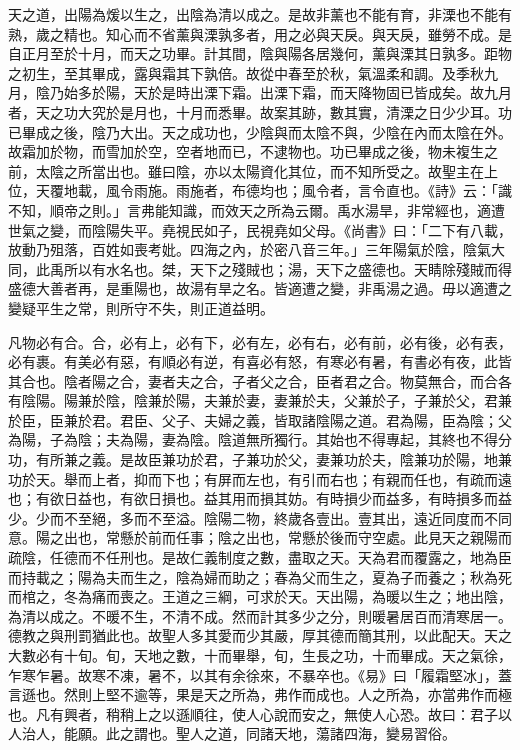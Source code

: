 
天之道，出陽為煖以生之，出陰為清以成之。是故非薰也不能有育，非溧也不能有熟，歲之精也。知心而不省薰與溧孰多者，用之必與天戾。與天戾，雖勞不成。是自正月至於十月，而天之功畢。計其間，陰與陽各居幾何，薰與溧其日孰多。距物之初生，至其畢成，露與霜其下孰倍。故從中春至於秋，氣溫柔和調。及季秋九月，陰乃始多於陽，天於是時出溧下霜。出溧下霜，而天降物固已皆成矣。故九月者，天之功大究於是月也，十月而悉畢。故案其跡，數其實，清溧之日少少耳。功已畢成之後，陰乃大出。天之成功也，少陰與而太陰不與，少陰在內而太陰在外。故霜加於物，而雪加於空，空者地而已，不逮物也。功已畢成之後，物未複生之前，太陰之所當出也。雖曰陰，亦以太陽資化其位，而不知所受之。故聖主在上位，天覆地載，風令雨施。雨施者，布德均也；風令者，言令直也。《詩》云：「識不知，順帝之則。」言弗能知識，而效天之所為云爾。禹水湯旱，非常經也，適遭世氣之變，而陰陽失平。堯視民如子，民視堯如父母。《尚書》曰：「二下有八載，放動乃殂落，百姓如喪考妣。四海之內，於密八音三年。」三年陽氣於陰，陰氣大同，此禹所以有水名也。桀，天下之殘賊也；湯，天下之盛德也。天睛除殘賊而得盛德大善者再，是重陽也，故湯有旱之名。皆適遭之變，非禹湯之過。毋以適遭之變疑平生之常，則所守不失，則正道益明。


凡物必有合。合，必有上，必有下，必有左，必有右，必有前，必有後，必有表，必有裹。有美必有惡，有順必有逆，有喜必有怒，有寒必有暑，有書必有夜，此皆其合也。陰者陽之合，妻者夫之合，子者父之合，臣者君之合。物莫無合，而合各有陰陽。陽兼於陰，陰兼於陽，夫兼於妻，妻兼於夫，父兼於子，子兼於父，君兼於臣，臣兼於君。君臣、父子、夫婦之義，皆取諸陰陽之道。君為陽，臣為陰；父為陽，子為陰；夫為陽，妻為陰。陰道無所獨行。其始也不得專起，其終也不得分功，有所兼之義。是故臣兼功於君，子兼功於父，妻兼功於夫，陰兼功於陽，地兼功於天。舉而上者，抑而下也；有屏而左也，有引而右也；有親而任也，有疏而遠也；有欲日益也，有欲日損也。益其用而損其妨。有時損少而益多，有時損多而益少。少而不至絕，多而不至溢。陰陽二物，終歲各壹出。壹其出，遠近同度而不同意。陽之出也，常懸於前而任事；陰之出也，常懸於後而守空處。此見天之親陽而疏陰，任德而不任刑也。是故仁義制度之數，盡取之天。天為君而覆露之，地為臣而持載之；陽為夫而生之，陰為婦而助之；春為父而生之，夏為子而養之；秋為死而棺之，冬為痛而喪之。王道之三綱，可求於天。天出陽，為暖以生之；地出陰，為清以成之。不暖不生，不清不成。然而計其多少之分，則暖暑居百而清寒居一。德教之與刑罰猶此也。故聖人多其愛而少其嚴，厚其德而簡其刑，以此配天。天之大數必有十旬。旬，天地之數，十而畢舉，旬，生長之功，十而畢成。天之氣徐，乍寒乍暑。故寒不凍，暑不，以其有余徐來，不暴卒也。《易》曰「履霜堅冰」，蓋言遜也。然則上堅不逾等，果是天之所為，弗作而成也。人之所為，亦當弗作而極也。凡有興者，稍稍上之以遜順往，使人心說而安之，無使人心恐。故曰：君子以人治人，能願。此之謂也。聖人之道，同諸天地，蕩諸四海，變易習俗。

